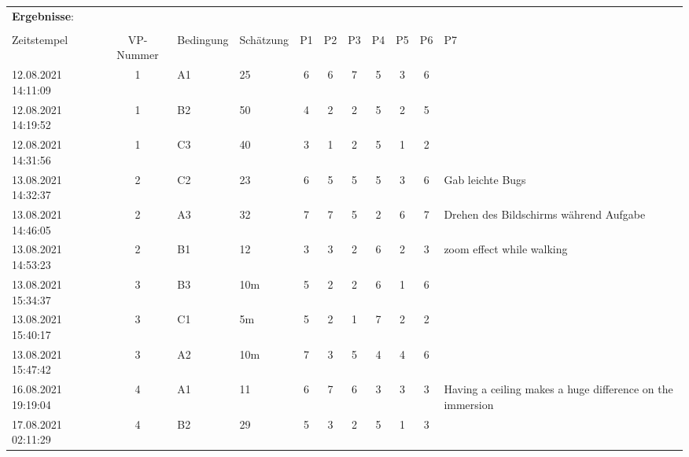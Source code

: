 \begin{landscape} %
\begin{table}[]
\begin{tabular}{lcllccccccp{7cm}}
\textbf{Ergebnisse}: \\ \\
Zeitstempel         & VP-Nummer & Bedingung         & Schätzung & P1 & P2 & P3 & P4 & P5 & P6 & P7                                                        \\
12.08.2021 14:11:09 & 1         & A1                & 25        & 6  & 6  & 7  & 5  & 3  & 6  &                                                           \\
12.08.2021 14:19:52 & 1         & B2                & 50        & 4  & 2  & 2  & 5  & 2  & 5  &                                                           \\
12.08.2021 14:31:56 & 1         & C3                & 40        & 3  & 1  & 2  & 5  & 1  & 2  &                                                           \\
13.08.2021 14:32:37 & 2         & C2                & 23        & 6  & 5  & 5  & 5  & 3  & 6  & Gab leichte Bugs                                          \\
13.08.2021 14:46:05 & 2         & A3                & 32        & 7  & 7  & 5  & 2  & 6  & 7  & Drehen des Bildschirms während Aufgabe                    \\
13.08.2021 14:53:23 & 2         & B1                & 12        & 3  & 3  & 2  & 6  & 2  & 3  & zoom effect while walking                                 \\
13.08.2021 15:34:37 & 3         & B3                & 10m       & 5  & 2  & 2  & 6  & 1  & 6  &                                                           \\
13.08.2021 15:40:17 & 3         & C1                & 5m        & 5  & 2  & 1  & 7  & 2  & 2  &                                                           \\
13.08.2021 15:47:42 & 3         & A2                & 10m       & 7  & 3  & 5  & 4  & 4  & 6  &                                                           \\
16.08.2021 19:19:04 & 4         & A1                & 11        & 6  & 7  & 6  & 3  & 3  & 3  & Having a ceiling makes a huge difference on the immersion \\
17.08.2021 02:11:29 & 4         & B2                & 29        & 5  & 3  & 2  & 5  & 1  & 3  &                                                           \\

\end{tabular}
\end{table}
\end{landscape}
